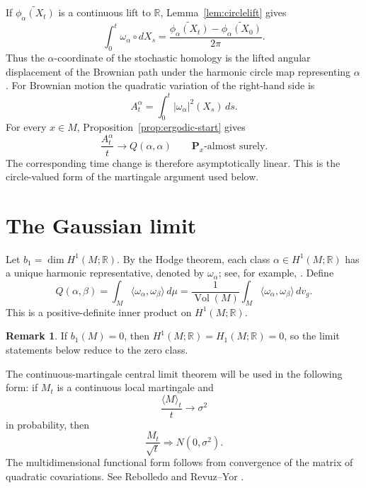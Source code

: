 \documentclass[a4paper,reqno]{amsart}
\newcommand{\R}{\mathbb R}
\newcommand{\Pp}{\mathbf P}
\newcommand{\Vol}{\operatorname{Vol}}
\theoremstyle{definition}
\newtheorem{remark}[theorem]{Remark}
\begin{document}
If $\widetilde{\phi_\alpha(X_t)}$ is a continuous lift to $\R$, Lemma~\ref{lem:circlelift} gives
\begin{equation}\label{eq:harmonic-circle-coordinate}
 \int_0^t\omega_\alpha\circ dX_s
 =\frac{\widetilde{\phi_\alpha(X_t)}-\widetilde{\phi_\alpha(X_0)}}{2\pi}.
\end{equation}
Thus the $\alpha$-coordinate of the stochastic homology is the lifted angular displacement of the Brownian path under the harmonic circle map representing $\alpha$.  For Brownian motion the quadratic variation of the right-hand side is
\[
 A_t^\alpha=\int_0^t |\omega_\alpha|^2(X_s)\,ds.
\]
For every $x\in M$, Proposition~\ref{prop:ergodic-start} gives
\[
 \frac{A_t^\alpha}{t}\longrightarrow Q(\alpha,\alpha)
 \qquad \Pp_x\text{-almost surely}.
\]
The corresponding time change is therefore asymptotically linear.  This is the circle-valued form of the martingale argument used below.

\section{The Gaussian limit}

Let $b_1=\dim H^1(M;\R)$.  By the Hodge theorem, each class $\alpha\in H^1(M;\R)$ has a unique harmonic representative, denoted by $\omega_\alpha$; see, for example, \cite[Chapter~3]{Jost}.  Define
\begin{equation}\label{eq:Q}
   Q(\alpha,\beta)
   =\int_M\langle\omega_\alpha,\omega_\beta\rangle\,d\mu
   =\frac{1}{\Vol(M)}
     \int_M\langle\omega_\alpha,\omega_\beta\rangle\,dv_g.
\end{equation}
This is a positive-definite inner product on $H^1(M;\R)$.

\begin{remark}
If $b_1(M)=0$, then $H^1(M;\R)=H_1(M;\R)=0$, so the limit statements below reduce to the zero class.
\end{remark}

The continuous-martingale central limit theorem will be used in the following form: if $M_t$ is a continuous local martingale and
\[
   \frac{\langle M\rangle_t}{t}\longrightarrow\sigma^2
\]
in probability, then
\[
   \frac{M_t}{\sqrt t}\Longrightarrow N(0,\sigma^2).
\]
The multidimensional functional form follows from convergence of the matrix of quadratic covariations.  See Rebolledo \cite{Rebolledo} and Revuz--Yor \cite{RevuzYor}.
\end{document}

